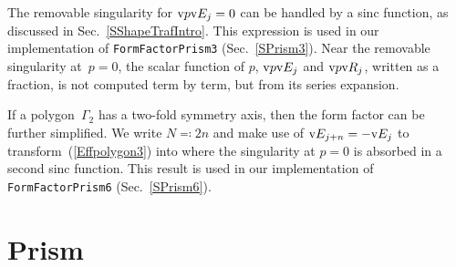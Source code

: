 The removable singularity for $\text{v}{p}\text{v}{E}_j=0$
can be handled by a sinc function, as discussed in Sec.~\ref{SShapeTrafIntro}.
This expression is used in our implementation of \texttt{FormFactorPrism3}
(Sec.~\ref{SPrism3}).
Near the removable singularity at~$p=0$,
the scalar function of $p$, $\text{v}{p}\text{v}{E}_j$ and $\text{v}{p}\text{v}{R}_j$,
written as a fraction,
 is not computed term by term,
but from its series expansion.

If a polygon~$\Gamma_2$ has a two-fold symmetry axis,
then the form factor can be further simplified.
We write $N\eqqcolon2n$
and make use of $\text{v}{E}_{j+n}=-\text{v}{E}_j$ to transform~(\ref{Effpolygon3}) into
where the singularity at $p=0$ is absorbed in a second sinc function.
This result is used in our implementation of \texttt{FormFactorPrism6}
(Sec.~\ref{SPrism6}).
%


%
%


\section{Prism}\label{SFFPrism}

%
%

